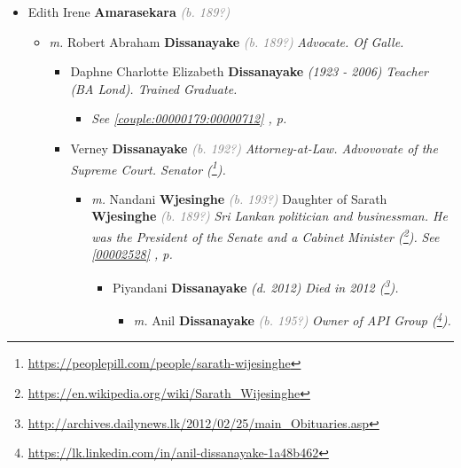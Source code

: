 \documentclass[10pt, openany]{book}
\begin{document}
\begin{itemize}
{\begin{itemize}
{\begin{itemize}
{\begin{itemize}
\item{Raja \textbf{Ekanayake} \textcolor{gray}{\textit{(b. 192?)}}
 }
\end{itemize}}
\end{itemize}
 }
\item{Edith Irene \textbf{Amarasekara} \textcolor{gray}{\textit{(b. 189?)}}
\begin{itemize}
\item{\textit{m.} Robert Abraham \textbf{Dissanayake} \textcolor{gray}{\textit{(b. 189?)}} \textcolor{slmaroon}{\textit{Advocate.
Of Galle.}}   \label{couple:00000058:00000181} \begin{itemize}
\item{Daphne Charlotte Elizabeth \textbf{Dissanayake} \textcolor{slorange}{\textit{(1923 - 2006)}} \textcolor{slmaroon}{\textit{Teacher (BA Lond). Trained Graduate.}}
\begin{itemize}
\item{\textcolor{slteal}{\textit{See  \autoref{couple:00000179:00000712} \textit{, p. \pageref{couple:00000179:00000712} }}}}
\end{itemize}
   }
\item{Verney \textbf{Dissanayake} \textcolor{gray}{\textit{(b. 192?)}} \textcolor{slmaroon}{\textit{Attorney-at-Law. Advovovate of the Supreme Court. Senator (\footnote{\url{https://peoplepill.com/people/sarath-wijesinghe}}).}}
\begin{itemize}
\item{\textit{m.} Nandani \textbf{Wjesinghe} \textcolor{gray}{\textit{(b. 193?)}} Daughter of  Sarath \textbf{Wjesinghe} \textcolor{gray}{\textit{(b. 189?)}} \textcolor{slmaroon}{\textit{Sri Lankan politician and businessman. He was the President of the Senate and a Cabinet Minister (\footnote{\url{https://en.wikipedia.org/wiki/Sarath_Wijesinghe}}).}} \textcolor{slteal}{\textit{See  \autoref{00002528} \textit{, p. \pageref{00002528} }}}   \label{couple:00000182:00001031} \begin{itemize}
\item{Piyandani \textbf{Dissanayake} \textcolor{slorange}{\textit{(d. 2012)}} \textcolor{slmaroon}{\textit{Died in 2012 (\footnote{\url{http://archives.dailynews.lk/2012/02/25/main_Obituaries.asp}}).}}
\begin{itemize}
\item{\textit{m.} Anil \textbf{Dissanayake} \textcolor{gray}{\textit{(b. 195?)}} \textcolor{slmaroon}{\textit{Owner of API Group (\footnote{\url{https://lk.linkedin.com/in/anil-dissanayake-1a48b462}}).}}   \label{couple:00000175:00000180} \begin{itemize}

\end{itemize}}
\end{itemize}}
\end{itemize}}
\end{itemize}}
\end{itemize}}
\end{itemize}}
\end{itemize}}
\end{itemize}
\end{document}

